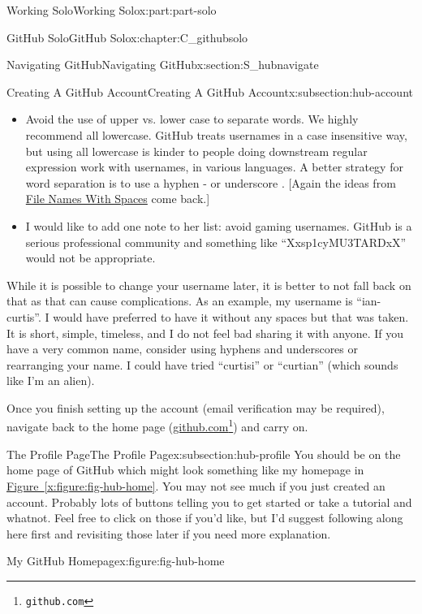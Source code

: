 \documentclass[oneside,10pt,]{book}
\newcommand{\xreffont}{\relax}
\begin{document}
\begin{partptx}{Working Solo}{}{Working Solo}{}{}{x:part:part-solo}
\begin{chapterptx}{GitHub Solo}{}{GitHub Solo}{}{}{x:chapter:C_githubsolo}
\begin{sectionptx}{Navigating GitHub}{}{Navigating GitHub}{}{}{x:section:S_hubnavigate}
\begin{subsectionptx}{Creating A GitHub Account}{}{Creating A GitHub Account}{}{}{x:subsection:hub-account}
\begin{enumerate}
\begin{itemize}[label=\textbullet]
\item{}Avoid the use of upper vs. lower case to separate words. We highly recommend all lowercase. GitHub treats usernames in a case insensitive way, but using all lowercase is kinder to people doing downstream regular expression work with usernames, in various languages. A better strategy for word separation is to use a hyphen - or underscore \textunderscore{}. [Again the ideas from \hyperlink{x:paragraphs:namesspaces}{File Names With Spaces} come back.]%
\item{}I would like to add one note to her list: avoid gaming usernames. GitHub is a serious professional community and something like ``Xx\textunderscore{}sp1cyMU3TARD\textunderscore{}xX'' would not be appropriate.%
\end{itemize}
While it is possible to change your username later, it is better to not fall back on that as that can cause complications. As an example, my username is ``ian-curtis''. I would have preferred to have it without any spaces but that was taken. It is short, simple, timeless, and I do not feel bad sharing it with anyone. If you have a very common name, consider using hyphens and underscores or rearranging your name. I could have tried ``curtisi'' or ``curtian'' (which sounds like I'm an alien).%
\end{enumerate}
%
\par
Once you finish setting up the account (email verification may be required), navigate back to the home page (\href{https://github.com}{github.com}\footnote{\nolinkurl{github.com}\label{g:fn:idp615688856}}) and carry on.%
\end{subsectionptx}
%
%
\typeout{************************************************}
\typeout{************************************************}
%
\begin{subsectionptx}{The Profile Page}{}{The Profile Page}{}{}{x:subsection:hub-profile}
%
%
%
%
%
You should be on the home page of GitHub which might look something like my homepage in \hyperref[x:figure:fig-hub-home]{Figure~{\xreffont\ref{x:figure:fig-hub-home}}}. You may not see much if you just created an account. Probably lots of buttons telling you to get started or take a tutorial and whatnot. Feel free to click on those if you'd like, but I'd suggest following along here first and revisiting those later if you need more explanation.%
\begin{figureptx}{My GitHub Homepage}{x:figure:fig-hub-home}{}%

\end{figureptx}
\end{subsectionptx}
\end{sectionptx}
\end{chapterptx}
\end{partptx}
\end{document}
